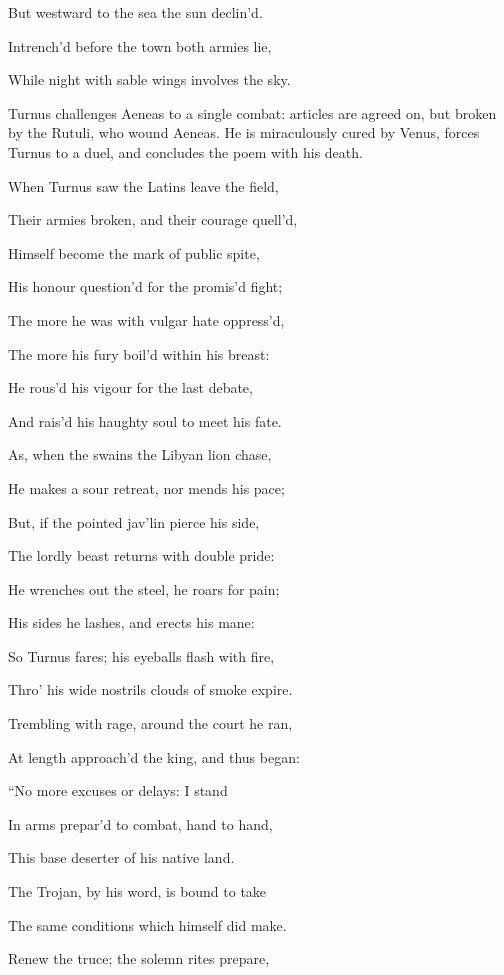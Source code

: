 But westward to the sea the sun declin’d.

Intrench’d before the town both armies lie,

While night with sable wings involves the sky.


Turnus challenges Aeneas to a single combat: articles are agreed on, but
broken by the Rutuli, who wound Aeneas. He is miraculously cured by Venus,
forces Turnus to a duel, and concludes the poem with his death.

When Turnus saw the Latins leave the field,

Their armies broken, and their courage quell’d,

Himself become the mark of public spite,

His honour question’d for the promis’d fight;

The more he was with vulgar hate oppress’d,

The more his fury boil’d within his breast:

He rous’d his vigour for the last debate,

And rais’d his haughty soul to meet his fate.

As, when the swains the Libyan lion chase,

He makes a sour retreat, nor mends his pace;

But, if the pointed jav’lin pierce his side,

The lordly beast returns with double pride:

He wrenches out the steel, he roars for pain;

His sides he lashes, and erects his mane:

So Turnus fares; his eyeballs flash with fire,

Thro’ his wide nostrils clouds of smoke expire.

Trembling with rage, around the court he ran,

At length approach’d the king, and thus began:

“No more excuses or delays: I stand

In arms prepar’d to combat, hand to hand,

This base deserter of his native land.

The Trojan, by his word, is bound to take

The same conditions which himself did make.

Renew the truce; the solemn rites prepare,

